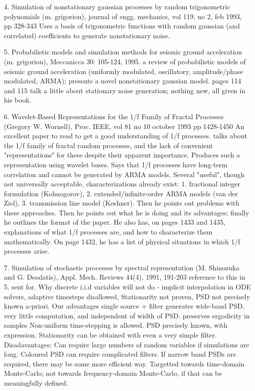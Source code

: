 {		4. Simulation of nonstationary gaussian processes by random
		trigonometric polynomials (m. grigoriou), journal of engg.
		mechanics, vol 119, no 2, feb 1993, pp 328-343
			Uses a basis of trigonometric functions with random
			gaussian (and correlated) coefficients to generate
			nonstationary noise.

		5. Probabilistic models and simulation methods for seismic
		ground acceleration (m. grigoriou), Meccanicca 30: 105-124,
		1995.
			a review of probabilistic models of seismic ground
			acceleration (uniformly modulated, oscillatory,
			amplitude/phase modulated, ARMA); presents a novel
			nonstationary gaussian model. pages 114 and 115 talk
			a little about stationary noise generation; nothing
			new, all given in his book.

		6. Wavelet-Based Representations for the 1/f Family of
		Fractal Processes (Gregory W. Wornell), Proc. IEEE, vol 81
		no 10 october 1993 pp 1428-1450
			An excellent paper to read to get a good
			understanding of 1/f processes.
			talks about the 1/f family of fractal random
			processes, and the lack of convenient
			"representations" for these despite their apparent
			importance. Produces such a representation using
			wavelet bases. Says that 1/f processes have
			long-term correlation and cannot be generated by
			ARMA models. Several "useful", though not
			universally acceptable, characterizations already
			exist: 1. fractional integer formulation (Kolmogorov),
			2. extended/infinite-order ARMA models (van der Ziel),
			3. transmission line model (Keshner). Then he points
			out problems with these approaches. Then he points
			out what he is doing and its advantages; finally he
			outlines the format of the paper.
			He also has, on pages 1433 and 1435, explanations of
			what 1/f processes are, and how to characterize them
			mathematically. On page 1432, he has a list of physical
			situations in which 1/f processes arise.

		7. Simulation of stochastic processes by spectral
		representation (M. Shinozuka and G. Deodatis), Appl. Mech.
		Reviews 44(4), 1991, 191-203
			reference to this in 5. sent for.
	Why discrete i.i.d variables will not do - implicit
		interpolation in ODE solvers, adaptive timesteps disallowed,
		Stationarity not proven, PSD not precisely known a-priori.
	Our advantages
		single source + filter generates wide-band PSD.
		very little computation, and independent of width of PSD.
		preserves ergodicity in samples
		Non-uniform time-stepping is allowed.
		PSD precisely known, with expression.
		Stationarity can be obtained with even a very simple filter.
	Disadavantages:
		Can require large numbers of random variables if simulations
			are long.
		Coloured PSD can require complicated filters.
		If narrow band PSDs are required, there may be some more
			efficient way.
		Targetted towards time-domain Monte-Carlo; not towards
		frequency-domain Monte-Carlo, if that can be meaningfully
		defined.
}

